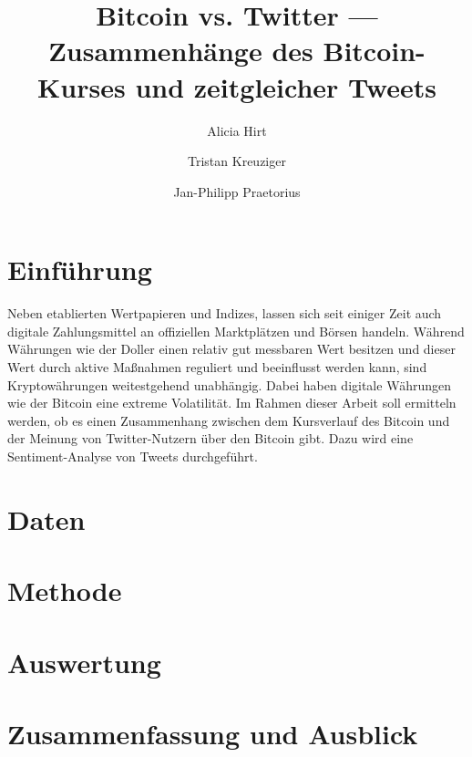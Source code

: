 \documentclass[
journal=jacsat, %
manuscript=article]{achemso}
\author{Alicia Hirt}
\author{Tristan Kreuziger}
\author{Jan-Philipp Praetorius}
\affiliation[Friedrich-Schiller-Universität Jena]
{Faculty of Mathematics and Computer Science, Friedrich-Schiller-Universität Jena, Germany}
\title[Bitcoin vs. Twitter]
{Bitcoin vs. Twitter --- Zusammenh\"ange des Bitcoin-Kurses und zeitgleicher Tweets}
\begin{document}
	
\renewcommand{\figurename}{Abbildung}

\section{Einf\"uhrung}

Neben etablierten Wertpapieren und Indizes, lassen sich seit einiger Zeit auch digitale Zahlungsmittel an offiziellen Marktpl\"atzen und B\"orsen handeln. W\"ahrend W\"ahrungen wie der Doller einen relativ gut messbaren Wert besitzen und dieser Wert durch aktive Ma{\ss}nahmen reguliert und beeinflusst werden kann, sind Kryptow\"ahrungen weitestgehend unabh\"angig. Dabei haben digitale W\"ahrungen wie der Bitcoin eine extreme Volatilit\"at. Im Rahmen dieser Arbeit soll ermitteln werden, ob es einen Zusammenhang zwischen dem Kursverlauf des Bitcoin und der Meinung von Twitter-Nutzern \"uber den Bitcoin gibt. Dazu wird eine Sentiment-Analyse von Tweets durchgef\"uhrt.

\newpage

\section{Daten}


\section{Methode}


\section{Auswertung}


\section{Zusammenfassung und Ausblick}

\end{document}
